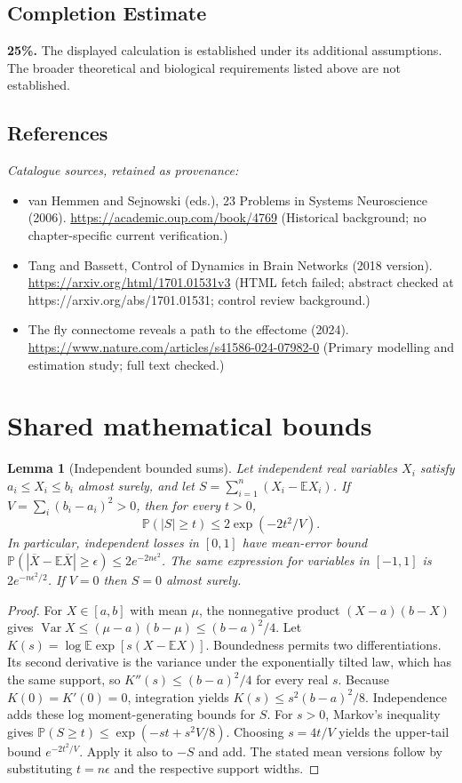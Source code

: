 \documentclass[11pt]{article}
\newcommand{\E}{\mathbb E}
\newcommand{\Prob}{\mathbb P}
\DeclareMathOperator{\Var}{Var}
\providecommand{\E}{\mathbb E}
\providecommand{\Prob}{\mathbb P}
\providecommand{\Var}{\operatorname{Var}}
\newtheorem{sharedlemma}{Lemma}[section]
\begin{document}
\subsection{Completion Estimate}
\textbf{25\%.} The displayed calculation is established under its additional assumptions. The broader theoretical and biological requirements listed above are not established.
\subsection{References}
\noindent\emph{Catalogue sources, retained as provenance:}
\begin{itemize}
\item van Hemmen and Sejnowski (eds.), 23 Problems in Systems Neuroscience (2006). \url{https://academic.oup.com/book/4769} (Historical background; no chapter-specific current verification.)
\item Tang and Bassett, Control of Dynamics in Brain Networks (2018 version). \url{https://arxiv.org/html/1701.01531v3} (HTML fetch failed; abstract checked at https://arxiv.org/abs/1701.01531; control review background.)
\item The fly connectome reveals a path to the effectome (2024). \url{https://www.nature.com/articles/s41586-024-07982-0} (Primary modelling and estimation study; full text checked.)
\end{itemize}
\clearpage


\appendix
\section{Shared mathematical bounds}\label{app:bounds}
\begin{sharedlemma}[Independent bounded sums]\label{lem:bounded}
Let independent real variables $X_i$ satisfy $a_i\leq X_i\leq b_i$ almost surely,
and let $S=\sum_{i=1}^n(X_i-\E X_i)$. If
$V=\sum_i(b_i-a_i)^2>0$, then for every $t>0$,
\[
 \Prob(|S|\geq t)\leq 2\exp(-2t^2/V).
\]
In particular, independent losses in $[0,1]$ have mean-error bound
$\Prob(|\overline X-\E\overline X|\geq\epsilon)
\leq2e^{-2n\epsilon^2}$. The same expression for variables in $[-1,1]$
is $2e^{-n\epsilon^2/2}$. If $V=0$ then $S=0$ almost surely.
\end{sharedlemma}
\begin{proof}
For $X\in[a,b]$ with mean $\mu$, the nonnegative product
$(X-a)(b-X)$ gives
$\Var X\leq(\mu-a)(b-\mu)\leq(b-a)^2/4$.
Let $K(s)=\log\E\exp[s(X-\E X)]$.
Boundedness permits two differentiations. Its second derivative is the variance
under the exponentially tilted law, which has the same support, so
$K''(s)\leq(b-a)^2/4$ for every real $s$.
Because $K(0)=K'(0)=0$, integration yields
$K(s)\leq s^2(b-a)^2/8$.
Independence adds these log moment-generating bounds for $S$.
For $s>0$, Markov's inequality gives
$\Prob(S\geq t)\leq\exp(-st+s^2V/8)$.
Choosing $s=4t/V$ yields the upper-tail bound $e^{-2t^2/V}$.
Apply it also to $-S$ and add. The stated mean versions follow by substituting
$t=n\epsilon$ and the respective support widths.
\end{proof}
\end{document}
